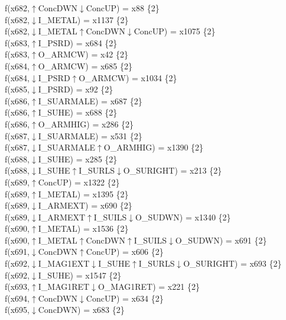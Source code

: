 f(x682,$\uparrow$ConcDWN$\downarrow$ConcUP) = x88 \{2\} \\  
f(x682,$\downarrow$I\_METAL) = x1137 \{2\} \\  
f(x682,$\downarrow$I\_METAL$\uparrow$ConcDWN$\downarrow$ConcUP) = x1075 \{2\} \\  
f(x683,$\uparrow$I\_PSRD) = x684 \{2\} \\  
f(x683,$\uparrow$O\_ARMCW) = x42 \{2\} \\  
f(x684,$\uparrow$O\_ARMCW) = x685 \{2\} \\  
f(x684,$\downarrow$I\_PSRD$\uparrow$O\_ARMCW) = x1034 \{2\} \\  
f(x685,$\downarrow$I\_PSRD) = x92 \{2\} \\  
f(x686,$\uparrow$I\_SUARMALE) = x687 \{2\} \\  
f(x686,$\uparrow$I\_SUHE) = x688 \{2\} \\  
f(x686,$\uparrow$O\_ARMHIG) = x286 \{2\} \\  
f(x687,$\downarrow$I\_SUARMALE) = x531 \{2\} \\  
f(x687,$\downarrow$I\_SUARMALE$\uparrow$O\_ARMHIG) = x1390 \{2\} \\  
f(x688,$\downarrow$I\_SUHE) = x285 \{2\} \\  
f(x688,$\downarrow$I\_SUHE$\uparrow$I\_SURLS$\downarrow$O\_SURIGHT) = x213 \{2\} \\  
f(x689,$\uparrow$ConcUP) = x1322 \{2\} \\  
f(x689,$\uparrow$I\_METAL) = x1395 \{2\} \\  
f(x689,$\downarrow$I\_ARMEXT) = x690 \{2\} \\  
f(x689,$\downarrow$I\_ARMEXT$\uparrow$I\_SUILS$\downarrow$O\_SUDWN) = x1340 \{2\} \\  
f(x690,$\uparrow$I\_METAL) = x1536 \{2\} \\  
f(x690,$\uparrow$I\_METAL$\uparrow$ConcDWN$\uparrow$I\_SUILS$\downarrow$O\_SUDWN) = x691 \{2\} \\  
f(x691,$\downarrow$ConcDWN$\uparrow$ConcUP) = x606 \{2\} \\  
f(x692,$\downarrow$I\_MAG1EXT$\downarrow$I\_SUHE$\uparrow$I\_SURLS$\downarrow$O\_SURIGHT) = x693 \{2\} \\  
f(x692,$\downarrow$I\_SUHE) = x1547 \{2\} \\  
f(x693,$\uparrow$I\_MAG1RET$\downarrow$O\_MAG1RET) = x221 \{2\} \\  
f(x694,$\uparrow$ConcDWN$\downarrow$ConcUP) = x634 \{2\} \\  
f(x695,$\downarrow$ConcDWN) = x683 \{2\} \\  
